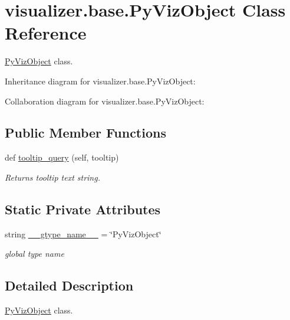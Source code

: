 \hypertarget{classvisualizer_1_1base_1_1PyVizObject}{}\section{visualizer.\+base.\+Py\+Viz\+Object Class Reference}
\label{classvisualizer_1_1base_1_1PyVizObject}


\hyperlink{classvisualizer_1_1base_1_1PyVizObject}{Py\+Viz\+Object} class.  




Inheritance diagram for visualizer.\+base.\+Py\+Viz\+Object\+:


Collaboration diagram for visualizer.\+base.\+Py\+Viz\+Object\+:
\subsection*{Public Member Functions}
\begin{DoxyCompactItemize}
\item 
def \hyperlink{classvisualizer_1_1base_1_1PyVizObject_a90239a572ea417decce5964a065978a7}{tooltip\+\_\+query} (self, tooltip)
\begin{DoxyCompactList}\small\item\em Returns tooltip text string. \end{DoxyCompactList}\end{DoxyCompactItemize}
\subsection*{Static Private Attributes}
\begin{DoxyCompactItemize}
\item 
string \hyperlink{classvisualizer_1_1base_1_1PyVizObject_a4a366e514c88f37d558ccea2c865c94c}{\+\_\+\+\_\+gtype\+\_\+name\+\_\+\+\_\+} = \char`\"{}Py\+Viz\+Object\char`\"{}
\begin{DoxyCompactList}\small\item\em global type name \end{DoxyCompactList}\end{DoxyCompactItemize}


\subsection{Detailed Description}
\hyperlink{classvisualizer_1_1base_1_1PyVizObject}{Py\+Viz\+Object} class. 

